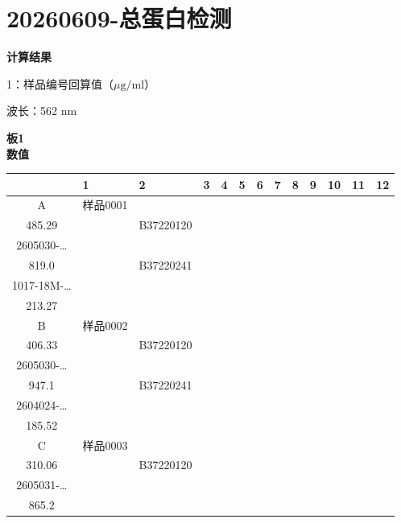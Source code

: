 \documentclass[UTF8,10pt,a4paper,fontset=fandol]{ctexart}
\newcommand{\fieldvalue}[1]{#1}
\begin{document}

\newpage

\section*{20260609-总蛋白检测}

\textbf{计算结果}

1：样品编号回算值（$\mu\mathrm{g/ml}$）

波长：562 nm

\textbf{板1}\\
\textbf{数值}

\begin{center}
\scriptsize
\begin{tabular}{c|p{1.05cm}|p{1.05cm}|p{1.05cm}|p{1.05cm}|p{1.05cm}|p{1.05cm}|p{1.05cm}|p{1.05cm}|p{1.05cm}|p{1.05cm}|p{1.05cm}|p{1.05cm}}
 & 1&2&3&4&5&6&7&8&9&10&11&12\\ \hline
A&
\fieldvalue{\scriptsize 样品0001\\485.29}
&&
\fieldvalue{\scriptsize B37220120\\2605030-\ldots\\819.0}
&&
\fieldvalue{\scriptsize B37220241\\1017-18M-\ldots\\213.27}
&&&&&&&\\ \hline
B&
\fieldvalue{\scriptsize 样品0002\\406.33}
&&
\fieldvalue{\scriptsize B37220120\\2605030-\ldots\\947.1}
&&
\fieldvalue{\scriptsize B37220241\\2604024-\ldots\\185.52}
&&&&&&&\\ \hline
C&
\fieldvalue{\scriptsize 样品0003\\310.06}
&&
\fieldvalue{\scriptsize B37220120\\2605031-\ldots\\865.2}

\end{tabular}
\end{center}
\end{document}
